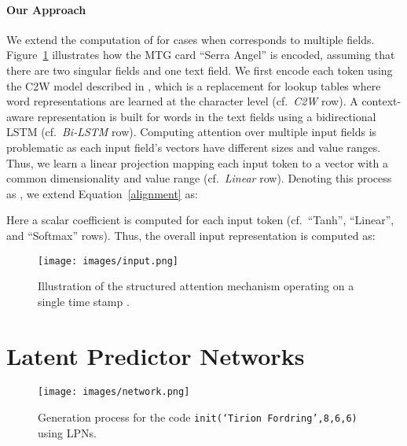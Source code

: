 \documentclass[11pt]{article}
\begin{document}
\paragraph{Our Approach} We extend the computation of  for cases when  corresponds to multiple fields.
Figure~\ref{input_img} illustrates how the MTG card
``Serra Angel'' is encoded, assuming that there are two singular fields and one
text field. We first encode each token  using the C2W model described
in , which is a replacement for lookup tables where word
representations are learned at the character level (cf.~\textit{C2W} row). A
context-aware representation is built for words in the text fields using a
bidirectional LSTM (cf.~\textit{Bi-LSTM} row). Computing attention over
multiple input fields is problematic as each input field's vectors have different sizes
and value ranges. Thus, we learn a linear projection mapping each input
token  to a vector with a common dimensionality and value range (cf.~\textit{Linear} row).
Denoting this process as , we extend
Equation~\ref{alignment} as:

Here a scalar coefficient  is computed for each input token
 (cf.~``Tanh'', ``Linear'', and ``Softmax'' rows). Thus, the overall input
representation  is computed as:


\begin{figure}[t]
  \begin{center}
    \centerline{\texttt{[image: images/input.png]}}
    \caption{Illustration of the structured attention mechanism operating on a single time stamp .}
    \label{input_img}
  \end{center}
\end{figure}

\section{Latent Predictor Networks}
\label{sec:lpn}

\begin{figure*}[ht]
\begin{center}
\centerline{\texttt{[image: images/network.png]}}
\caption{Generation process for the code \texttt{init(`Tirion Fordring',8,6,6)} using LPNs.}
\label{model_img}
\end{center}
\end{figure*}
\end{document}
